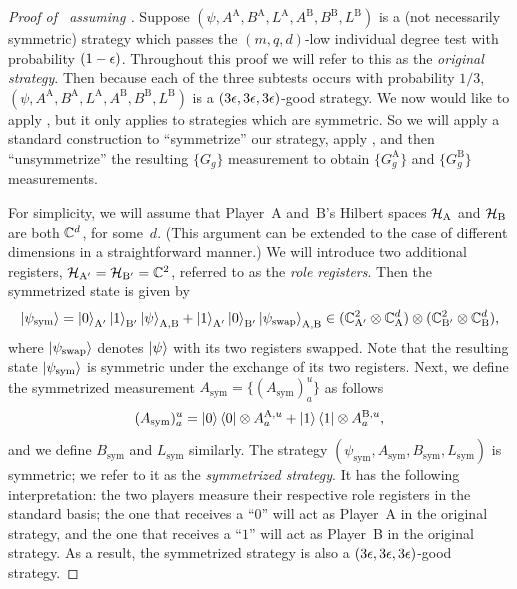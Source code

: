 \begin{proof}[Proof of~ assuming ]
Suppose $(\psi, A^{\mathrm{A}},B^{\mathrm{A}},L^{\mathrm{A}},A^{\mathrm{B}},B^{\mathrm{B}},L^{\mathrm{B}})$
is a (not necessarily symmetric) strategy
 which passes the $(m, q, d)$-low individual degree test
with probability $(1-\epsilon)$.
Throughout this proof we will refer to this as the \emph{original strategy}.
Then because each of the three subtests occurs with probability $1/3$,
$(\psi, A^{\mathrm{A}},B^{\mathrm{A}},L^{\mathrm{A}},A^{\mathrm{B}},B^{\mathrm{B}},L^{\mathrm{B}})$ is a $(3\epsilon, 3\epsilon, 3\epsilon)$-good strategy.
We now would like to apply ,
but it only applies to strategies which are symmetric.
So we will apply a standard construction to ``symmetrize'' our strategy,
apply ,
and then ``unsymmetrize'' the resulting $\{G_g\}$ measurement to obtain $\{G^{\mathrm{A}}_g\}$ and $\{G^{\mathrm{B}}_g\}$ measurements.

For simplicity, we will assume that Player~$\mathrm{A}$ and~$\mathrm{B}$'s
Hilbert spaces $\mathcal{H}_{\mathrm{A}}$ and $\mathcal{H}_{\mathrm{B}}$
are both $\mathbb C^d$, for some~$d$.
(This argument can be extended to the case of different dimensions in a straightforward manner.)
We will introduce two additional registers, $\mathcal{H}_{\mathrm{A}'} =\mathcal{H}_{\mathrm{B'}} = \mathbb C^2$,
referred to as the \emph{role registers}.
Then the symmetrized state is given by
\begin{equation*}
\ket{\psi_{\mathrm{sym}}} = \ket{0}_{\mathrm{A}'}\ket{1}_{\mathrm{B}'} \ket{\psi}_{\mathrm{A},\mathrm{B}}
					+\ket{1}_{\mathrm{A}'}\ket{0}_{\mathrm{B}'} \ket{\psi_{\mathrm{swap}}}_{\mathrm{A},\mathrm{B}}
					\in (\mathbb C^2_{\mathrm{A}'} \otimes \mathbb C^d_{\mathrm{A}}) \otimes 
						(\mathbb C^2_{\mathrm{B}'} \otimes \mathbb C^d_{\mathrm{B}}),
\end{equation*}
where $\ket{\psi_{\mathrm{swap}}}$ denotes $\ket{\psi}$ with its two registers swapped.
Note that the resulting state $\ket{\psi_{\mathrm{sym}}}$ is symmetric under the exchange of its two registers.
Next, we define the symmetrized measurement $A_{\mathrm{sym}} = \{(A_{\mathrm{sym}})^u_a\}$ as follows
\begin{equation*}
(A_{\mathrm{sym}})^u_a = \ket{0}\bra{0} \otimes A^{\mathrm{A},u}_a + \ket{1} \bra{1} \otimes A^{\mathrm{B},u}_a,
\end{equation*}
and we define $B_{\mathrm{sym}}$ and $L_{\mathrm{sym}}$ similarly.
The strategy $(\psi_{\mathrm{sym}}, A_{\mathrm{sym}}, B_{\mathrm{sym}}, L_{\mathrm{sym}})$
is symmetric; we refer to it as the \emph{symmetrized strategy}.
It has the following interpretation:
the two players measure their respective role registers in the standard basis;
the one that receives a ``$0$'' will act as Player~A in the original strategy,
and the one that receives a ``$1$'' will act as Player~B in the original strategy.
As a result, the symmetrized strategy is also a $(3\epsilon, 3\epsilon, 3\epsilon)$-good strategy.


\end{proof}
